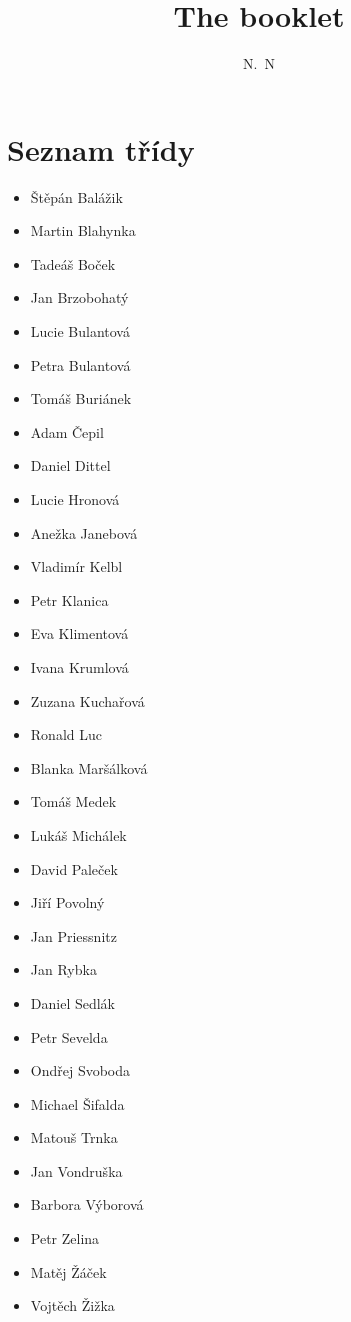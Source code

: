 \documentclass[12pt]{article}
\author{N.~N}
\title{The booklet}
\begin{document}
\newcommand{\hlod}[1]{\par{}#1}

\maketitle
\tableofcontents

\section{Seznam třídy}

\begin{itemize}
	\item Štěpán Balážik
    \item Martin Blahynka
    \item Tadeáš Boček
    \item Jan Brzobohatý
    \item Lucie Bulantová
    \item Petra Bulantová
    \item Tomáš Buriánek
    \item Adam Čepil
    \item Daniel Dittel
    \item Lucie Hronová
    \item Anežka Janebová
    \item Vladimír Kelbl
    \item Petr Klanica
    \item Eva Klimentová
    \item Ivana Krumlová
    \item Zuzana Kuchařová
    \item Ronald Luc
    \item Blanka Maršálková
    \item Tomáš Medek
    \item Lukáš Michálek
    \item David Paleček
    \item Jiří Povolný
    \item Jan Priessnitz
    \item Jan Rybka
    \item Daniel Sedlák
    \item Petr Sevelda
    \item Ondřej Svoboda
    \item Michael Šifalda
    \item Matouš Trnka
    \item Jan Vondruška
    \item Barbora Výborová
    \item Petr Zelina
    \item Matěj Žáček
    \item Vojtěch Žižka
\end{itemize}



\end{document}
